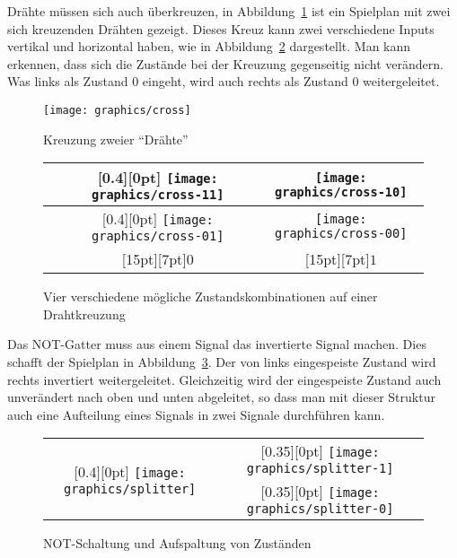 Drähte müssen sich auch überkreuzen, in Abbildung~\ref{minesweeper-cross}
ist ein Spielplan mit zwei sich kreuzenden Drähten gezeigt. Dieses
Kreuz kann zwei verschiedene Inputs vertikal und horizontal haben,
wie in Abbildung~\ref{minesweeper-crosses} dargestellt. Man kann
erkennen, dass sich die Zustände bei der Kreuzung gegenseitig nicht
verändern. Was links als Zustand 0 eingeht, wird auch rechts als Zustand
0 weitergeleitet.
\begin{figure}
\begin{center}
\texttt{[image: graphics/cross]}
\end{center}
\caption{Kreuzung zweier ``Drähte''\label{minesweeper-cross}}
\end{figure}%
\begin{figure}
\begin{center}
\begin{tabular}{|l|c|c|}
\hline
\raisebox{12ex}{$0$}&
\raisebox{0pt}[0.4\hsize][0pt]{%
\texttt{[image: graphics/cross-11]}}&
\texttt{[image: graphics/cross-10]}\\
\hline
\raisebox{12ex}{$1$}&
\raisebox{0pt}[0.4\hsize][0pt]{%
\texttt{[image: graphics/cross-01]}}&
\texttt{[image: graphics/cross-00]}\\
\hline
&\raisebox{0pt}[15pt][7pt]{$0$}&%
\raisebox{0pt}[15pt][7pt]{$1$}\\
\hline
\end{tabular}
\end{center}
\caption{Vier verschiedene mögliche Zustandskombinationen auf
einer Drahtkreuzung\label{minesweeper-crosses}}
\end{figure}%

Das NOT-Gatter muss aus einem Signal das invertierte Signal
machen. Dies schafft der Spielplan in Abbildung~\ref{splitter}.
Der von links eingespeiste Zustand wird rechts invertiert weitergeleitet.
Gleichzeitig wird der eingespeiste Zustand auch unverändert nach
oben und unten abgeleitet, so dass man mit dieser Struktur auch
eine Aufteilung eines Signals in zwei Signale durchführen kann.
\begin{figure}
\begin{center}
\begin{tabular}{|c|c|c|c|}
\hline
\multirow{2}{0.4\hsize}{%
\raisebox{-5ex}[0.4\hsize][0pt]{%
\texttt{[image: graphics/splitter]}%
}}&
\raisebox{11.5ex}{$0$}&
\raisebox{0pt}[0.35\hsize][0pt]{%
\texttt{[image: graphics/splitter-1]}}&
\raisebox{11ex}{$1$}\\
\cline{2-4}
&
\raisebox{11.5ex}{$1$}&
\raisebox{0pt}[0.35\hsize][0pt]{%
\texttt{[image: graphics/splitter-0]}}&
\raisebox{11ex}{$0$}\\
\hline
\end{tabular}
\end{center}
\caption{NOT-Schaltung und Aufspaltung von Zuständen\label{splitter}}
\end{figure}%


